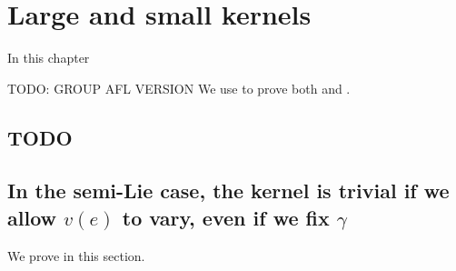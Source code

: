 \chapter{Large and small kernels}
\label{ch:ker}

In this chapter
\begin{itemize}
  \ii TODO: GROUP AFL VERSION
  \ii We use  to prove
  both  and  .
\end{itemize}

\section{TODO}

\section{In the semi-Lie case, the kernel is trivial if we allow $v(e)$ to vary, even if we fix $\gamma$}
We prove  in this section.

